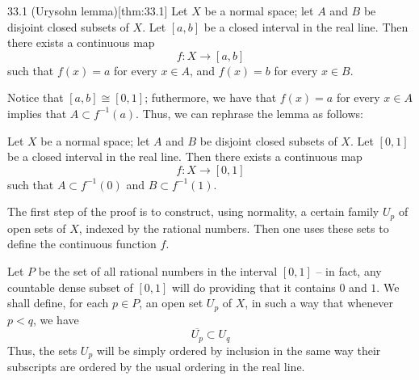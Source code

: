 \begin{thmBox}{33.1 (Urysohn lemma)}[thm:33.1]
    Let \( X \) be a normal space; let \( A \) and \( B \) be disjoint closed subsets
    of \( X \). 
    Let \( [ a, b ] \) be a closed interval in the real line.
    Then there exists a continuous map 
    \begin{equation*}
        f: X \rightarrow [ a, b ]
    \end{equation*}
    such that \( f ( x ) = a \) for every \( x \in A \), and \( f ( x ) = b \) for
    every \( x \in B \). 

    \baseRule

    \begin{proofBox}
        Notice that \( [ a, b ] \cong [ 0, 1 ] \); futhermore, we have that
        \( f ( x ) = a \) for every \( x \in A \) implies that 
        \( A \subset f^{ -1 } ( a ) \).
        Thus, we can rephrase the lemma as follows:

        \baseSkip

        Let \( X \) be a normal space; let \( A \) and \( B \) be disjoint closed 
        subsets of \( X \). 
        Let \( [ 0, 1 ] \) be a closed interval in the real line.
        Then there exists a continuous map 
        \begin{equation*}
            f: X \rightarrow [ 0, 1 ]
        \end{equation*}
        such that \( A \subset f^{ -1 } ( 0 ) \) and \( B \subset f^{ -1 } ( 1 ) \).

        \baseRule

        The first step of the proof is to construct, using normality, a certain family
        \( U_{ p } \) of open sets of \( X \), indexed by the rational numbers.
        Then one uses these sets to define the continuous function \( f \).

        \baseSkip
        Let \( P \) be the set of all rational numbers in the interval \( [ 0, 1 ] \) --
        in fact, any countable dense subset of \( [ 0, 1 ] \) will do providing that it 
        contains \( 0 \) and \( 1 \).
        We shall define, for each \( p \in P \), an open set \( U_{ p } \) of \( X \),
        in such a way that whenever \( p < q \), we have 
        \begin{equation*}
            \overline{ U_{ p } } \subset U_{ q }    
        \end{equation*}
        Thus, the sets \( U_{ p } \) will be simply ordered by inclusion in the same
        way their subscripts are ordered by the usual ordering in the real line.


\end{proofBox}
\end{thmBox}
